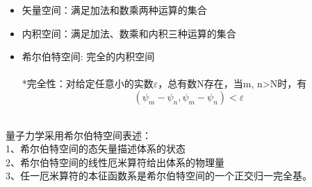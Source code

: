 \begin{frame}
   \begin{itemize}
       \item 矢量空间：满足加法和数乘两种运算的集合
       \item 内积空间：满足加法、数乘和内积三种运算的集合
       \item 希尔伯特空间:  完全的内积空间\\
       ~~ \\
       *完全性：对给定任意小的实数$\varepsilon$，总有数N存在，当m, n>N时，有\\
       $$ (\psi_m -\psi_n, \psi_m -\psi_n )< \varepsilon $$
   \end{itemize} 
   ~~\\
   量子力学采用希尔伯特空间表述：\\
   1、希尔伯特空间的态矢量描述体系的状态\\
   2、希尔伯特空间的线性厄米算符给出体系的物理量\\
   3、任一厄米算符的本征函数系是希尔伯特空间的一个正交归一完全基。
\end{frame} 